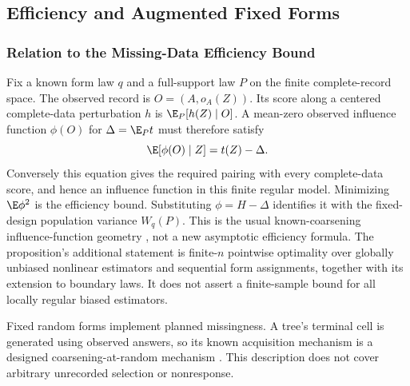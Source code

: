 \subsection{Efficiency and Augmented Fixed Forms}\label{app:augmentation}
\subsubsection{Relation to the Missing-Data Efficiency Bound}
Fix a known form law $q$ and a full-support law $P$ on the finite complete-record space. The observed record is $O=(A,o_A(Z))$. Its score along a centered complete-data perturbation $h$ is $\E_P[h(Z)\mid O]$. A mean-zero observed influence function $\phi(O)$ for $\Delta=\E_Pt$ must therefore satisfy
\[
 \E[\phi(O)\mid Z]=t(Z)-\Delta.
\]
Conversely this equation gives the required pairing with every complete-data score, and hence an influence function in this finite regular model. Minimizing $\E\phi^2$ is the efficiency bound. Substituting $\phi=H-\Delta$ identifies it with the fixed-design population variance $W_q(P)$. This is the usual known-coarsening influence-function geometry \citep{robins1994,tsiatis2006}, not a new asymptotic efficiency formula. The proposition's additional statement is finite-$n$ pointwise optimality over globally unbiased nonlinear estimators and sequential form assignments, together with its extension to boundary laws. It does not assert a finite-sample bound for all locally regular biased estimators.

Fixed random forms implement planned missingness. A tree's terminal cell is generated using observed answers, so its known acquisition mechanism is a designed coarsening-at-random mechanism \citep{heitjan1991,gill1997}. This description does not cover arbitrary unrecorded selection or nonresponse.

